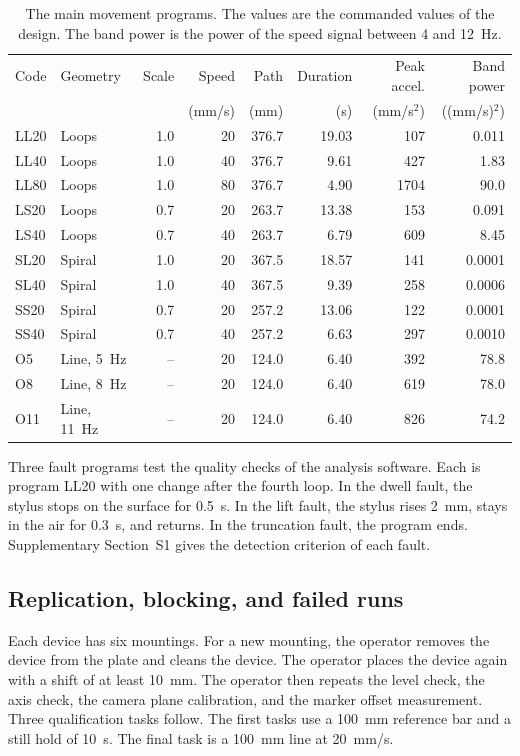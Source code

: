 \begin{table}[t]
\centering
\caption{The main movement programs.
The values are the commanded values of the design.
The band power is the power of the speed signal between 4 and 12~Hz.}
\label{tab:programs}
\begin{tabular}{@{}llrrrrrr@{}}
\toprule
Code & Geometry & Scale & Speed & Path & Duration & Peak accel. & Band power \\
 & & & (mm/s) & (mm) & (s) & (mm/s$^2$) & ((mm/s)$^2$) \\
\midrule
LL20 & Loops & 1.0 & 20 & 376.7 & 19.03 & 107 & 0.011 \\
LL40 & Loops & 1.0 & 40 & 376.7 & 9.61 & 427 & 1.83 \\
LL80 & Loops & 1.0 & 80 & 376.7 & 4.90 & 1704 & 90.0 \\
LS20 & Loops & 0.7 & 20 & 263.7 & 13.38 & 153 & 0.091 \\
LS40 & Loops & 0.7 & 40 & 263.7 & 6.79 & 609 & 8.45 \\
SL20 & Spiral & 1.0 & 20 & 367.5 & 18.57 & 141 & 0.0001 \\
SL40 & Spiral & 1.0 & 40 & 367.5 & 9.39 & 258 & 0.0006 \\
SS20 & Spiral & 0.7 & 20 & 257.2 & 13.06 & 122 & 0.0001 \\
SS40 & Spiral & 0.7 & 40 & 257.2 & 6.63 & 297 & 0.0010 \\
O5 & Line, 5~Hz & -- & 20 & 124.0 & 6.40 & 392 & 78.8 \\
O8 & Line, 8~Hz & -- & 20 & 124.0 & 6.40 & 619 & 78.0 \\
O11 & Line, 11~Hz & -- & 20 & 124.0 & 6.40 & 826 & 74.2 \\
\bottomrule
\end{tabular}
\end{table}

Three fault programs test the quality checks of the analysis software.
Each is program LL20 with one change after the fourth loop.
In the dwell fault, the stylus stops on the surface for 0.5~s.
In the lift fault, the stylus rises 2~mm, stays in the air for 0.3~s, and returns.
In the truncation fault, the program ends.
Supplementary Section~S1 gives the detection criterion of each fault.

\subsection{Replication, blocking, and failed runs}
\label{sec:replication}
Each device has six mountings.
For a new mounting, the operator removes the device from the plate and cleans the device.
The operator places the device again with a shift of at least 10~mm.
The operator then repeats the level check, the axis check, the camera plane calibration, and the marker offset measurement.
Three qualification tasks follow.
The first tasks use a 100~mm reference bar and a still hold of 10~s.
The final task is a 100~mm line at 20~mm/s.

